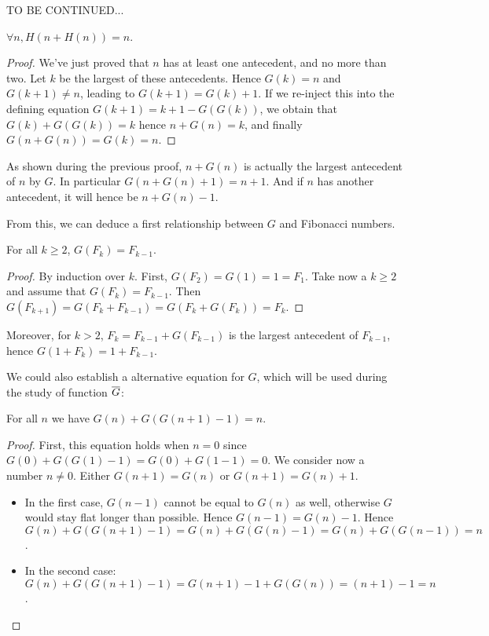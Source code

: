 \documentclass[a4paper,11pt]{article}
\begin{document}
\TODO TO BE CONTINUED...

\begin{theorem}\label{Gonto}
$\forall n, H(n+H(n))=n$.
\end{theorem}
\begin{proof}
We've just proved that $n$ has at least one antecedent, and
no more than two. Let $k$ be the largest of these antecedents.
Hence $G(k)=n$ and $G(k+1)\neq n$, leading to $G(k+1)=G(k)+1$.
If we re-inject this into the defining equation $G(k+1) = k+1 -
G(G(k))$, we obtain that $G(k)+G(G(k))=k$ hence $n+G(n)=k$,
and finally $G(n+G(n))=G(k)=n$.
\end{proof}

As shown during the previous proof, $n+G(n)$ is actually the largest antecedent
of $n$ by $G$. In particular $G(n+G(n)+1)=n+1$. And if $n$ has another
antecedent, it will hence be $n+G(n)-1$.

From this, we can deduce a first relationship between $G$ and
Fibonacci numbers.
\begin{theorem}\label{Gfib} For all $k\ge 2$, $G(F_k)=F_{k-1}$.
\end{theorem}
\begin{proof}By induction over $k$. First, $G(F_2)=G(1)=1=F_1$.
Take now a $k\ge 2$ and assume that $G(F_k)=F_{k-1}$.
Then $G(F_{k+1})=G(F_k+F_{k-1})=G(F_k+G(F_k))=F_k$.
\end{proof}

Moreover, for $k>2$, $F_k = F_{k-1}+G(F_{k-1})$ is the largest antecedent of
$F_{k-1}$, hence $G(1+F_k)=1+F_{k-1}$.

We could also establish a alternative equation for $G$, which will be
used during the study of function $\overline{G}$:

\begin{theorem}\label{Galt} For all $n$ we have $G(n) + G(G(n+1)-1) = n$.
\end{theorem}
\begin{proof}
First, this equation holds when $n=0$ since
$G(0)+G(G(1)-1) = G(0) + G(1-1) = 0$.
We consider now a number $n\neq 0$. Either $G(n+1)=G(n)$ or $G(n+1)=G(n)+1$.
\begin{itemize}
\item In the first case, $G(n-1)$ cannot be equal to $G(n)$ as well,
otherwise $G$ would stay flat longer than possible. Hence $G(n-1)=G(n)-1$.
Hence $G(n)+G(G(n+1)-1) = G(n) + G(G(n)-1) = G(n)+G(G(n-1)) = n$.
\item In the second case:
$G(n) + G(G(n+1)-1) = G(n+1)-1 + G(G(n)) = (n+1)-1 = n$.
\end{itemize}
\end{proof}
\end{document}
